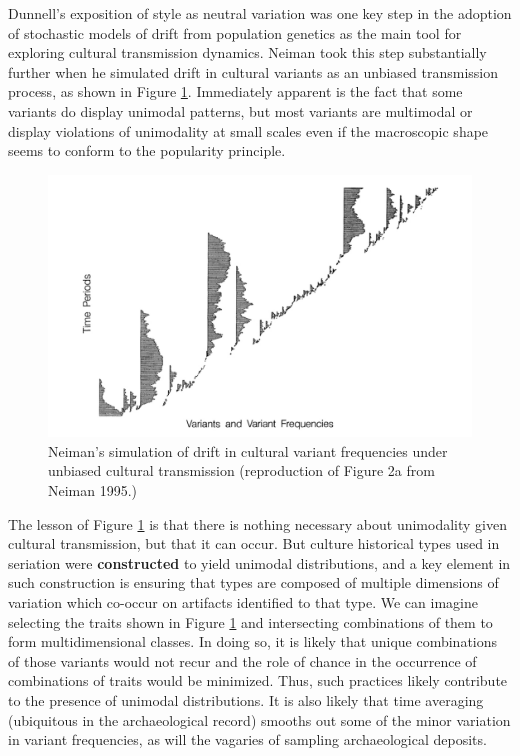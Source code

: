 \documentclass[graybox,natbib]{svmult}
\begin{document}
Dunnell's \citeyearpar{Dunnell1978} exposition of style as neutral
variation was one key step in the adoption of stochastic models of drift
from population genetics as the main tool for exploring cultural
transmission dynamics. Neiman \citeyearpar{Neiman1995} took this step
substantially further when he simulated drift in cultural variants as an
unbiased transmission process, as shown in Figure \ref{img:neiman-fig2}.
Immediately apparent is the fact that some variants do display unimodal
patterns, but most variants are multimodal or display violations of
unimodality at small scales even if the macroscopic shape seems to
conform to the popularity principle.

\begin{figure}[ht]
\centering
\includegraphics[scale=0.6]{neiman-1995-figure2a.pdf}
\caption{Neiman's simulation of drift in cultural variant frequencies under unbiased cultural transmission (reproduction of Figure 2a from Neiman 1995.)}
\label{img:neiman-fig2}
\end{figure}

The lesson of Figure \ref{img:neiman-fig2} is that there is nothing
necessary about unimodality given cultural transmission, but that it can
occur. But culture historical types used in seriation were
\textbf{constructed} to yield unimodal distributions, and a key element
in such construction is ensuring that types are composed of multiple
dimensions of variation which co-occur on artifacts identified to that
type. We can imagine selecting the traits shown in Figure
\ref{img:neiman-fig2} and intersecting combinations of them to form
multidimensional classes. In doing so, it is likely that unique
combinations of those variants would not recur and the role of chance in
the occurrence of combinations of traits would be minimized. Thus, such
practices likely contribute to the presence of unimodal distributions.
It is also likely that time averaging (ubiquitous in the archaeological
record) smooths out some of the minor variation in variant frequencies,
as will the vagaries of sampling archaeological deposits.
\end{document}
